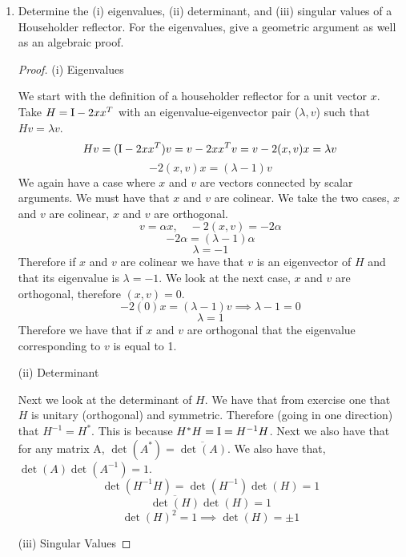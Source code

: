 \documentclass{article}
\begin{document}
\begin{enumerate}
\item %
Determine the (i) eigenvalues, (ii) determinant, and (iii) singular values of a Householder reflector. For the eigenvalues, give a geometric argument as well as an algebraic proof. 

\begin{proof}
    (i) Eigenvalues 

    We start with the definition of a householder reflector for a unit vector $x$. Take $H = \mathrm{I} - 2xx^T$ with an eigenvalue-eigenvector pair ($\lambda, v$) such that $Hv = \lambda v$. 
    \[
        Hv = (\mathrm{I} - 2xx^T)v = v - 2xx^Tv = v - 2(x, v)x = \lambda v  
    \]
    \[
        -2(x, v) x = (\lambda - 1) v
    \]
    We again have a case where $x$ and $v$ are vectors connected by scalar arguments. We must have that $x$ and $v$ are colinear. We take the two cases, $x$ and $v$ are colinear, $x$ and $v$ are orthogonal. 
    \[
        v = \alpha x, \quad -2(x, v) = -2\alpha
    \]
    \[
        -2\alpha = (\lambda - 1) \alpha 
    \]
    \[
        \lambda = -1
    \]
    Therefore if $x$ and $v$ are colinear we have that $v$ is an eigenvector of $H$ and that its eigenvalue is $\lambda = -1$. We look at the next case, $x$ and $v$ are orthogonal, therefore $(x, v) = 0$. 
    \[
        -2(0)x = (\lambda - 1)v \implies \lambda - 1 = 0
    \]
    \[
        \lambda = 1 
    \]
    Therefore we have that if $x$ and $v$ are orthogonal that the eigenvalue corresponding to $v$ is equal to 1. 
    \vspace{5pt}

    (ii) Determinant 

    Next we look at the determinant of $H$. We have that from exercise one that $H$ is unitary (orthogonal) and symmetric. Therefore (going in one direction) that $H^{-1} = H^*$. This is because $H^*H = \mathrm{I} = H^{-1}H$. Next we also have that for any matrix A, $\det(A^*) = \overline{\det(A)}$. We also have that, $\det(A)\det(A^{-1}) = 1$.
    \[
        \det(H^{-1}H) = \det(H^{-1})\det(H) = 1
    \]
    \[
        \overline{\det(H)}\det(H) = 1 
    \]
    \[
        \det(H)^2 = 1 \implies \det(H) = \pm 1
    \]
    
    (iii) Singular Values


\end{proof}
\end{enumerate}
\end{document}
